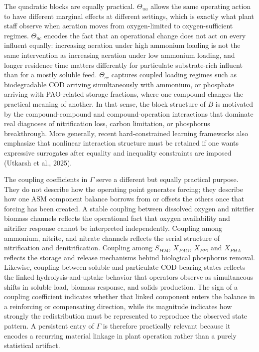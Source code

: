 \documentclass[11pt]{article}
\begin{document}
The quadratic blocks are equally practical. $\Theta_{uu}$ allows the same operating action to have different marginal effects at different settings, which is exactly what plant staff observe when aeration moves from oxygen-limited to oxygen-sufficient regimes. $\Theta_{uc}$ encodes the fact that an operational change does not act on every influent equally: increasing aeration under high ammonium loading is not the same intervention as increasing aeration under low ammonium loading, and longer residence time matters differently for particulate substrate-rich influent than for a mostly soluble feed. $\Theta_{cc}$ captures coupled loading regimes such as biodegradable COD arriving simultaneously with ammonium, or phosphate arriving with PAO-related storage fractions, where one compound changes the practical meaning of another. In that sense, the block structure of $B$ is motivated by the compound-compound and compound-operation interactions that dominate real diagnoses of nitrification loss, carbon limitation, or phosphorus breakthrough. More generally, recent hard-constrained learning frameworks also emphasize that nonlinear interaction structure must be retained if one wants expressive surrogates after equality and inequality constraints are imposed (Utkarsh et al., 2025).

The coupling coefficients in $\Gamma$ serve a different but equally practical purpose. They do not describe how the operating point generates forcing; they describe how one ASM component balance borrows from or offsets the others once that forcing has been created. A stable coupling between dissolved oxygen and nitrifier biomass channels reflects the operational fact that oxygen availability and nitrifier response cannot be interpreted independently. Coupling among ammonium, nitrite, and nitrate channels reflects the serial structure of nitrification and denitrification. Coupling among $S_{PO4}$, $X_{PAO}$, $X_{PP}$, and $X_{PHA}$ reflects the storage and release mechanisms behind biological phosphorus removal. Likewise, coupling between soluble and particulate COD-bearing states reflects the linked hydrolysis-and-uptake behavior that operators observe as simultaneous shifts in soluble load, biomass response, and solids production. The sign of a coupling coefficient indicates whether that linked component enters the balance in a reinforcing or compensating direction, while its magnitude indicates how strongly the redistribution must be represented to reproduce the observed state pattern. A persistent entry of $\Gamma$ is therefore practically relevant because it encodes a recurring material linkage in plant operation rather than a purely statistical artifact.
\end{document}
